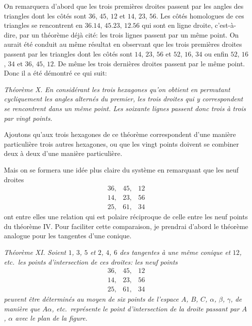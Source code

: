 \documentclass[11pt,a4paper]{book}
\begin{document}
On remarquera d'abord que les trois premi\`eres droites passent par les angles des triangles dont les c\^ot\'es sont $36$, $45$, $12$ et $14$, $23$, $56$. Les c\^ot\'es homologues de ces triangles se rencontrent en $36.14$, $45.23$, $12.56$ qui sont en ligne droite, c'est-\`a-dire, par un th\'eor\`eme d\'ej\`a cit\'e: les trois lignes passent par un m\^eme point. On aurait \'et\'e conduit au m\^eme r\'esultat en observant que les trois premi\`eres droites passent par les triangles dont les c\^ot\'es sont $14$, $23$, $56$ et $52$, $16$, $34$ ou enfin $52$, $16$, $34$ et $36$, $45$, $12$. De m\^eme les trois derni\`eres droites passent par le m\^eme point. Donc il a \'et\'e d\'emontr\'e ce qui suit:

\smallskip
\textit{Th\'eor\`eme X. En consid\'erant les trois hexagones qu'on obtient en permutant cycliquement les angles altern\'es du premier, les trois droites qui y correspondent se rencontrent dans un m\^eme point. Les soixante lignes passent donc trois \`a trois par vingt points.}
\smallskip

Ajoutons qu'aux trois hexagones de ce th\'eor\`eme correspondent d'une mani\`ere particuli\`ere trois autres hexagones, ou que les vingt points doivent se combiner deux \`a deux d'une mani\`ere particuli\`ere.

Mais on se formera une id\'ee plus claire du syst\`eme en remarquant que les neuf droites
\[
\begin{array}{ccc}
36, & 45, & 12 \\
14, & 23, & 56 \\
25, & 61, & 34
\end{array}
\]
ont entre elles une relation qui est polaire r\'eciproque de celle entre les neuf points du th\'eor\`eme IV. Pour faciliter cette comparaison, je prendrai d'abord le th\'eor\`eme analogue pour les tangentes d'une conique.

\smallskip
\textit{Th\'eor\`eme XI. Soient $1$, $3$, $5$ et $2$, $4$, $6$ des tangentes \`a une m\^eme conique et $12$, etc.\ les points d'intersection de ces droites: les neuf points
\[
\begin{array}{ccc}
36, & 45, & 12 \\
14, & 23, & 56 \\
25, & 61, & 34
\end{array}
\]
peuvent \^etre d\'etermin\'es au moyen de six points de l'espace $A$, $B$, $C$, $\alpha$, $\beta$, $\gamma$, de mani\`ere que $A\alpha$, etc.\ repr\'esente le point d'intersection de la droite passant par $A$, $\alpha$ avec le plan de la figure.}
\smallskip
\end{document}
